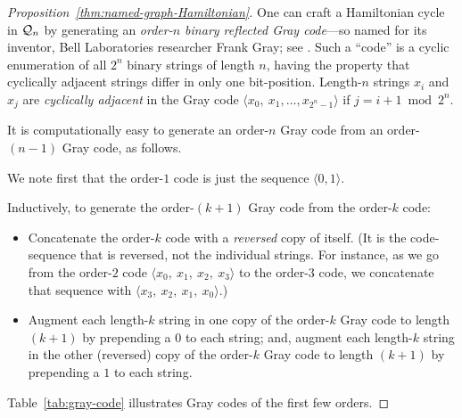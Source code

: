 \begin{proof}[Proposition~\ref{thm:named-graph-Hamiltonian}]
\smallskip

  

One can craft a Hamiltonian cycle in $\mbox{$\cal Q$}_n$ by generating an {\it order-$n$ binary reflected Gray code}---so named for its inventor, Bell Laboratories researcher Frank Gray; see \cite{PetersonW81}.   Such a ``code'' is a cyclic enumeration of all $2^n$ binary strings of length $n$, having the property that cyclically adjacent strings differ in only one bit-position.  Length-$n$ 
strings $x_i$ and $x_j$ are {\it cyclically adjacent} in the Gray code $\langle x_0, \ x_1, \ldots, x_{2^n-1} \rangle$ if $j = i+1 \bmod 2^n$.

\smallskip

\noindent
It is computationally easy to generate an order-$n$ Gray code from an order-$(n-1)$ Gray code, as follows.

\smallskip

We note first that the order-$1$ code is just the sequence $\langle 0, 1 \rangle$.

\smallskip

Inductively, to generate the order-$(k+1)$ Gray code from the order-$k$ code:
\begin{itemize}
\item
Concatenate the order-$k$ code with a {\em reversed} copy of itself.  (It is the code-sequence that is reversed, not the individual strings.  For instance, as we go from the order-$2$ code $\langle x_0, \ x_1, \ x_2, \ x_3 \rangle$ to the order-$3$ code, we concatenate that sequence with $\langle x_3, \ x_2, \ x_1, \ x_0 \rangle$.)

\item
Augment each length-$k$ string in one copy of the order-$k$ Gray code to length $(k+1)$ by prepending a $0$ to each string; and, augment each length-$k$ string in the other (reversed) copy of the order-$k$ Gray code to length $(k+1)$ by prepending a $1$ to each string.
\end{itemize}
Table~\ref{tab:gray-code} illustrates Gray codes of the first few orders.


\end{proof}
